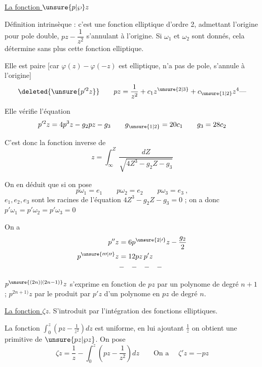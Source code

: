 \uline{La fonction $\unsure{p|\wp}z$}

Définition intrinsèque : c'est une fonction elliptique d'ordre 2, admettant l'origine pour pole double,   $pz-\dfrac{1}{z^2}$ s'annulant à l'origine. Si $\omega_1$ et $\omega_2$ sont donnés, cela détermine sans plus cette fonction elliptique.

Elle est paire [car $\varphi(z)-\varphi(-z)$ est elliptique, n'a pas de pole, s'annule à l'origine]  
\[
\deleted{\unsure{p^{\prime2}z}}\qquad
pz=\frac1{z^2}+c_1z^{\unsure{2|3}}+c_{\unsure{1|2}}z^4\mathord{\text{---}}
\]

Elle vérifie l'équation
\[
p^{\prime 2}z=4p^3z-g_2pz-g_3\qquad
g_{\unsure{1|2}}=20c_1\qquad g_3=28c_2
\]

C'est donc la fonction inverse de
\[
z=\int_\infty^Z\frac{dZ}{\sqrt{4Z^3-g_2Z-g_3}}
\]

On en déduit que si on pose
\[
p\omega_1=e_1\qquad p\omega_2=e_2\qquad p\omega_3=e_3\ ,
\]
$e_1,e_2,e_3$ sont les racines de l'équation $4Z^3-g_2Z-g_3=0$ ; on a donc $p'\omega_1=p'\omega_2=p'\omega_3=0$

On a 
\[
\begin{aligned}
p''z&=6p^{\unsure{2|\prime}}z-\frac{g_2}{2}\\
p^{\unsure{\prime\prime\prime|\prime\prime}}z&=12pz\,p'z\\
&\mathord{-}\quad\mathord{-}\quad\mathord{-}\quad\mathord{-}
\end{aligned}
\]

$p^{\unsure{(2n)|(2n-1)}}z$ s'exprime en fonction de $pz$ par un polynome de degré $n+1$ ; $p^{2n+1)}z$ par le produit par $p'z$ d'un polynome en $pz$ de degré $n$.


\uline{La fonction $\zeta z$}. S'introduit par l'intégration des fonctions elliptiques.

La fonction $\int_0^z(pz-\frac1{z^2})dz$ est uniforme, en lui ajoutant $\frac1z$ on obtient une primitive de $\unsure{pz|\wp z}$. On pose
\[
\zeta z=\frac1z-\int_0^z(pz-\frac1{z^2})dz\qquad\text{On a }\quad\zeta'z=-pz
\]
